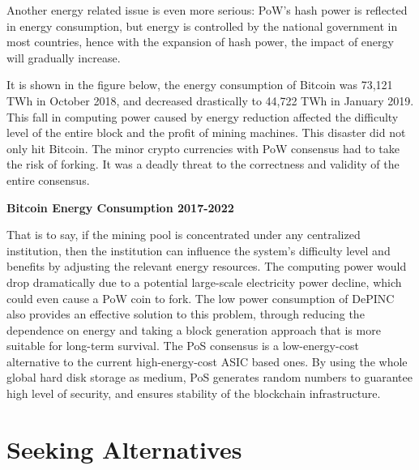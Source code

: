 \begin{flushleft}
    Another energy related issue is even more serious: PoW's hash power is reflected in energy consumption, but energy is controlled by the national government in most countries, hence with the expansion of hash power, the impact of energy will gradually increase.
\end{flushleft}
\begin{flushleft}
    It is shown in the figure below, the energy consumption of Bitcoin was 73,121 TWh in October 2018, and decreased drastically to 44,722 TWh in January 2019. This fall in computing power caused by energy reduction affected the difficulty level of the entire block and the profit of mining machines. This disaster did not only hit Bitcoin. The minor crypto currencies with PoW consensus had to take the risk of forking. It was a deadly threat to the correctness and validity of the entire consensus.
\end{flushleft}
\begin{flushleft}
    \centering\textbf{Bitcoin Energy Consumption 2017-2022}
\end{flushleft}

\begin{flushleft}
    That is to say, if the mining pool is concentrated under any centralized institution, then the institution can influence the system's difficulty level and benefits by adjusting the relevant energy resources. The computing power would drop dramatically due to a potential large-scale electricity power decline, which could even cause a PoW coin to fork. The low power consumption of DePINC also provides an effective solution to this problem, through reducing the dependence on energy and taking a block generation approach that is more suitable for long-term survival. The PoS consensus is a low-energy-cost alternative to the current high-energy-cost ASIC based ones. By using the whole global hard disk storage as medium, PoS generates random numbers to guarantee high level of security, and ensures stability of the blockchain infrastructure.
\end{flushleft}
\section{Seeking Alternatives}
